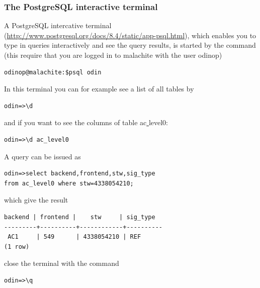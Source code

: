 \documentclass[12pt]{article}
\begin{document}
\subsubsection{The PostgreSQL interactive terminal} 
\label{sec:psql}
A PostgreSQL intercative terminal (\url{http://www.postgresql.org/docs/8.4/static/app-psql.html}), which enables you to type in queries 
interactively and see the query results, 
is started by the command (this require that you are logged in 
to malachite with the user odinop)  
\begin{verbatim}
odinop@malachite:$psql odin
\end{verbatim}
In this terminal you can for example see a list of all tables by
\begin{verbatim}
odin=>\d
\end{verbatim}
and if you want to see the columns of table ac\underline{ }level0:
\begin{verbatim}
odin=>\d ac_level0
\end{verbatim}
A query can be issued as
\begin{verbatim}
odin=>select backend,frontend,stw,sig_type 
from ac_level0 where stw=4338054210;
\end{verbatim}
which give the result
\begin{verbatim}
backend | frontend |    stw     | sig_type 
---------+----------+------------+----------
 AC1     | 549      | 4338054210 | REF
(1 row)
\end{verbatim}
close the terminal with the command 
\begin{verbatim}
odin=>\q
\end{verbatim}
\end{document}
